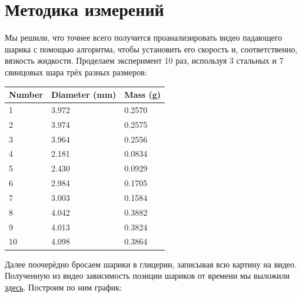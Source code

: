 \documentclass[a4paper, 12pt]{article}
\begin{document}
    \section{Методика измерений}

    Мы решили, что точнее всего получится проанализировать видео падающего шарика с помощью алгоритма,
    чтобы установить его скорость и, соответственно, вязкость жидкости.
    Проделаем эксперимент 10 раз, используя 3 стальных и 7 свинцовых шара трёх разных размеров:

    \vspace{1.5em}
    \begin{tabular}{l l l}
        \bfseries Number & \bfseries Diameter (mm) & \bfseries Mass (g) \\ \hline
        1                & 3.972                   & 0.2570             \\ \hline
        2                & 3.974                   & 0.2575             \\ \hline
        3                & 3.964                   & 0.2556             \\ \hline
        4                & 2.181                   & 0.0834             \\ \hline
        5                & 2.430                   & 0.0929             \\ \hline
        6                & 2.984                   & 0.1705             \\ \hline
        7                & 3.003                   & 0.1584             \\ \hline
        8                & 4.042                   & 0.3882             \\ \hline
        9                & 4.013                   & 0.3824             \\ \hline
        10               & 4.098                   & 0.3864             \\ \hline
    \end{tabular}
    \vspace{1.5em}

    Далее поочерёдно бросаем шарики в глицерин, записывая всю картину на видео.
    Полученную из видео зависимость позиции шариков от времени мы выложили
    \href{https://github.com/phys-labs-at-hse/glycerine/tree/master/particular_balls}{здесь}.
    Построим по ним график:
\end{document}
